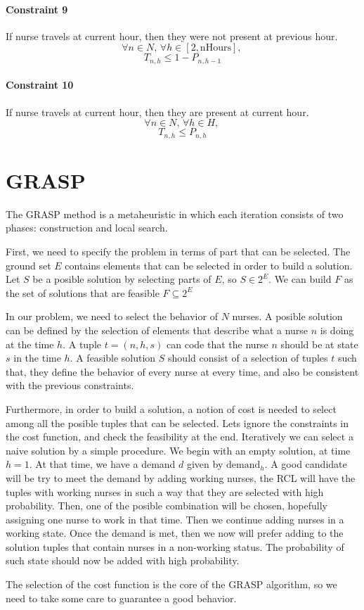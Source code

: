 \documentclass[12pt,a4paper]{article}
\begin{document}
\paragraph{Constraint 9} If nurse travels at current hour, then they were not 
present at previous hour.
$$ \forall n \in N,\,\forall h \in [2, \textrm{nHours}],\,$$
$$ T_{n,h} \le 1 - P_{n, h-1} $$
%
\paragraph{Constraint 10} If nurse travels at current hour, then they are 
present at current hour.
$$ \forall n \in N,\,\forall h \in H,\,$$
$$ T_{n,h} \le P_{n, h} $$
%
%
\section{GRASP}
%
The GRASP method is a metaheuristic in which each iteration consists of two 
phases: construction and local search.

First, we need to specify the problem in terms of part that can be selected. The 
ground set $E$ contains elements that can be selected in order to build a 
solution. Let $S$ be a posible solution by selecting parts of $E$, so $S \in 
2^E$. We can build $F$ as the set of solutions that are feasible $F \subseteq 
2^E$

In our problem, we need to select the behavior of $N$ nurses. A posible solution 
can be defined by the selection of elements that describe what a nurse $n$ is 
doing at the time $h$. A tuple $t = (n, h, s)$ can code that the nurse $n$ 
should be at state $s$ in the time $h$. A feasible solution $S$ should consist 
of a selection of tuples $t$ such that, they define the behavior of every nurse 
at every time, and also be consistent with the previous constraints.

Furthermore, in order to build a solution, a notion of cost is needed to select 
among all the posible tuples that can be selected. Lets ignore the constraints 
in the cost function, and check the feasibility at the end. Iteratively we can 
select a naive solution by a simple procedure. We begin with an empty solution, 
at time $h = 1$. At that time, we have a demand $d$ given by 
$\textrm{demand}_h$. A good candidate will be try to meet the demand by adding 
working nurses, the RCL will have the tuples with working nurses in such a way 
that they are selected with high probability. Then, one of the posible 
combination will be chosen, hopefully assigning one nurse to work in that time.  
Then we continue adding nurses in a working state. Once the demand is met, then 
we now will prefer adding to the solution tuples that contain nurses in a 
non-working status. The probability of such state should now be added with high 
probability.

The selection of the cost function is the core of the GRASP algorithm, so we 
need to take some care to guarantee a good behavior.
\end{document}
